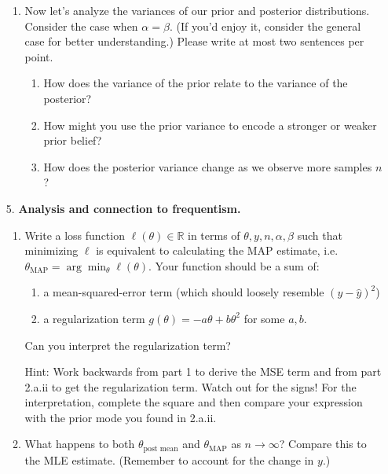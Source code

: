 \documentclass[submit]{harvardml}
\begin{document}
\begin{framed}
\begin{enumerate}
\begin{enumerate}
        \item Now let's analyze the variances of our prior and posterior distributions. Consider the case when $\alpha = \beta$. (If you'd enjoy it, consider the general case for better understanding.) Please write at most two sentences per point.
              \begin{enumerate}
                \item How does the variance of the prior relate to the variance of the posterior?
                \item How might you use the prior variance to encode a stronger or weaker prior belief?
                \item How does the posterior variance change as we observe more samples $n$?
              \end{enumerate}
      \end{enumerate}

    \item[5.]
      \textbf{Analysis and connection to frequentism.}

      \begin{enumerate}
        \item
              Write a loss function \(\ell(\theta) \in \mathbb{R}\) in terms of
              \(\theta, y, n, \alpha, \beta\) such that minimizing \(\ell\) is
              equivalent to calculating the MAP estimate,
              i.e.~\(\theta_{\text{MAP}} = \arg \min_{\theta} \ell(\theta)\). Your
              function should be a sum of:
              \begin{enumerate}
                \item a mean-squared-error term (which should loosely resemble $(y - \hat y)^2$)
                \item a
                      regularization term \(g(\theta) = - a \theta + b \theta^{2}\) for some $a, b$.
              \end{enumerate}

              Can you interpret the regularization term?

              Hint: Work backwards from part 1 to derive the MSE term and from part 2.a.ii to get the regularization term. Watch out for the signs! For the interpretation, complete the square and then compare your expression with the prior mode you found in 2.a.ii.
        \item
              What happens to both $\theta_{\text{post mean}}$ and $\theta_{\text{MAP}}$ as \(n \to \infty\)? Compare this to the MLE estimate.
              (Remember to account for the change in \(y\).)
      \end{enumerate}

  \end{enumerate}

\end{framed}
\end{document}
